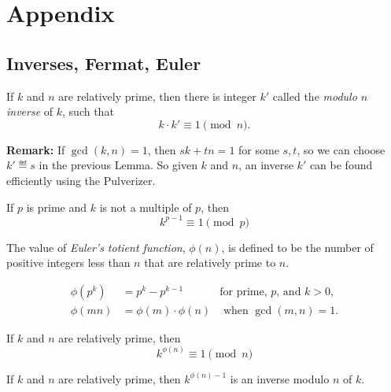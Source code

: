 \instatements{\newpage}

\section*{Appendix}

\subsection*{Inverses, Fermat, Euler}

\begin{lemma*}
If $k$ and $n$ are relatively prime, then there is integer
$k'$ called the \emph{modulo $n$ inverse} of $k$, such that
\[
k \cdot k' \equiv 1 \pmod n.
\]
\end{lemma*}

\textbf{Remark:} If $\gcd(k,n) =1$, then $sk+tn = 1$ for some $s,t$, so we
can choose $k' \eqdef s$ in the previous Lemma.  So given $k$ and $n$, an
inverse $k'$ can be found efficiently using the Pulverizer.

\begin{theorem*}
If $p$ is prime and $k$ is not a multiple of $p$, then
\[
k^{p-1} \equiv 1 \pmod{p}
\]
\end{theorem*}

\begin{definition*}
The value of \emph{Euler's totient function}, $\phi(n)$, is defined to be
the number of positive integers less than $n$ that are relatively prime to
$n$.
\end{definition*}

\begin{lemma*}
\begin{align*}
\phi(p^k)& = p^k - p^{k-1} & \text{for prime, $p$, and $k>0$},\\
\phi(mn) & = \phi(m)\cdot \phi(n) &\text{ when } \gcd(m,n)=1.
\end{align*}
\end{lemma*}

\begin{theorem*}
If $k$ and $n$ are relatively prime, then
\[
k^{\phi(n)} \equiv 1 \pmod{n}
\]
\end{theorem*}

\begin{corollary*}
If $k$ and $n$ are relatively prime, then $k^{\phi(n)-1}$ is an inverse
modulo $n$ of $k$.
\end{corollary*}

